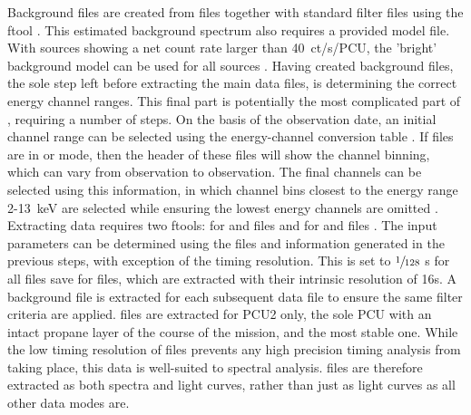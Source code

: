 Background files are created from  files together with standard filter files using the ftool  \citep{pcabackest}. This estimated background spectrum also requires a provided model file. With sources showing a net count rate larger than 40~ct/s/PCU, the 'bright' background model can be used for all sources \citep{pcadigest}. Having created background files, the sole step left before extracting the main data files, is determining the correct energy channel ranges. This final part is potentially the most complicated part of \chromos, requiring a number of steps. On the basis of the observation date, an initial channel range can be selected using the energy-channel conversion table \citep{rxteenergychannel}. If files are in  or  mode, then the header of these files will show the channel binning, which can vary from observation to observation. The final channels can be selected using this information, in which channel bins closest to the energy range 2-13~keV are selected while ensuring the lowest energy channels are omitted \citep[see][]{gleissner2004long}.\\

Extracting data requires two ftools:  for  and  files and  for  and  files \citep{saextrct,seextrct}. The input parameters can be determined using the files and information generated in the previous steps, with exception of the timing resolution. This is set to $\sfrac{1}{128}\ $s for all files save for  files, which are extracted with their intrinsic resolution of 16s. A background file is extracted for each subsequent data file to ensure the same filter criteria are applied.  files are extracted for PCU2 only, the sole PCU with an intact propane layer of the course of the mission, and the most stable one. While the low timing resolution of  files prevents any high precision timing analysis from taking place, this data is well-suited to spectral analysis.  files are therefore extracted as both spectra and light curves, rather than just as light curves as all other data modes are.\\

